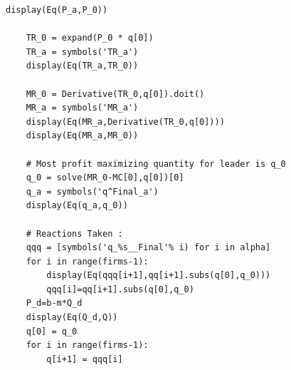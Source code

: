 \documentclass[phd, 12pt, print]{fauthesis}
\begin{document}
\begin{lstlisting}[frame=single]
    display(Eq(P_a,P_0))
    
    TR_0 = expand(P_0 * q[0])
    TR_a = symbols('TR_a')
    display(Eq(TR_a,TR_0))
    
    MR_0 = Derivative(TR_0,q[0]).doit()
    MR_a = symbols('MR_a')
    display(Eq(MR_a,Derivative(TR_0,q[0])))
    display(Eq(MR_a,MR_0))
    
    # Most profit maximizing quantity for leader is q_0
    q_0 = solve(MR_0-MC[0],q[0])[0]
    q_a = symbols('q^Final_a')
    display(Eq(q_a,q_0))
    
    # Reactions Taken :
    qqq = [symbols('q_%s__Final'% i) for i in alpha]
    for i in range(firms-1):
        display(Eq(qqq[i+1],qq[i+1].subs(q[0],q_0)))
        qqq[i]=qq[i+1].subs(q[0],q_0)
    P_d=b-m*Q_d
    display(Eq(Q_d,Q))
    q[0] = q_0
    for i in range(firms-1):
        q[i+1] = qqq[i]

\end{lstlisting}



\printbibliography
\end{document}
